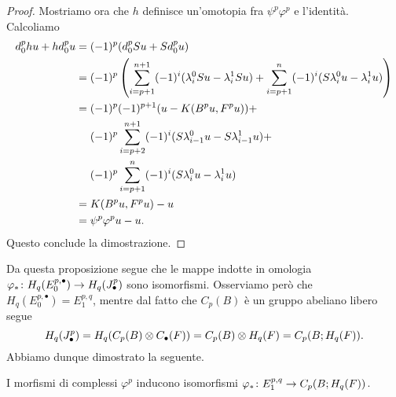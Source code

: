 \begin{proof}
Mostriamo ora che $h$ definisce un'omotopia fra $\psi^p\varphi^p$ e l'identità. Calcoliamo
\begin{align*}
d^p_0hu+hd^p_0u&=(-1)^p(d^p_0Su+Sd^p_0u)\\
&=(-1)^p\left(\sum_{i=p+1}^{n+1}(-1)^i(\lambda^0_iSu-\lambda^1_iSu)+\sum_{i=p+1}^n(-1)^i(S\lambda^0_iu-\lambda^1_iu)\right)\\
&=(-1)^p(-1)^{p+1}(u-K(B^pu,F^pu))+\\
&\phantomop(-1)^p\sum_{i=p+2}^{n+1}(-1)^i(S\lambda^0_{i-1}u-S\lambda^1_{i-1}u)+\\
&\phantomop(-1)^p\sum_{i=p+1}^n(-1)^i(S\lambda^0_iu-\lambda^1_iu)\\
&=K(B^pu,F^pu)-u\\
&=\psi^p\varphi^pu-u.
\end{align*}
Questo conclude la dimostrazione.
\end{proof}

Da questa proposizione segue che le mappe indotte in omologia $\varphi_*\colon H_q(E^{p,\bullet}_0)\to H_q(J^p_\bullet)$ sono isomorfismi. Osserviamo però che $H_q(E^{p,\bullet}_0)=E^{p,q}_1$, mentre dal fatto che $C_p(B)$ è un gruppo abeliano libero segue
$$
H_q(J^p_\bullet)=H_q(C_p(B)\mathbin{\otimes} C_\bullet(F))=C_p(B)\mathbin{\otimes} H_q(F)=C_p(B;H_q(F)).
$$
Abbiamo dunque dimostrato la seguente.
\begin{proposition}
I morfismi di complessi $\varphi^p$ inducono isomorfismi $\varphi_*\colon E^{p,q}_1\to C_p(B;H_q(F))$.
\end{proposition}


